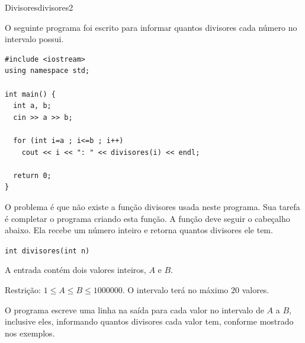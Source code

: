 \documentclass[12pt,a4paper,oneside]{article}
\begin{document}
\begin{problem}{Divisores}{divisores}{2}

\begingroup
\setlength{\intextsep}{0pt}%

O seguinte programa foi escrito para informar quantos divisores cada número no intervalo possui.

{%
\begin{lstlisting}
#include <iostream>
using namespace std;

int main() {
  int a, b;
  cin >> a >> b;

  for (int i=a ; i<=b ; i++)
    cout << i << ": " << divisores(i) << endl;

  return 0;
}
\end{lstlisting}
}

O problema é que não existe a função divisores usada neste programa. Sua tarefa é completar o programa criando esta função. A função deve seguir o cabeçalho abaixo.
Ela recebe um número inteiro e retorna quantos divisores ele tem.

\texttt{\textcolor{Mulberry}{int} divisores(\textcolor{Mulberry}{int} n)}


\InputFile

A entrada contém dois valores inteiros, $A$ e $B$.

Restrição: $1 \leq A \leq B \leq 1000000$. O intervalo terá no máximo $20$ valores.

\endgroup

\OutputFile

O programa escreve uma linha na saída para cada valor no intervalo de $A$ a $B$, inclusive eles, informando quantos divisores cada valor tem, conforme mostrado nos exemplos.


\Example

\begin{example}
%
\end{example}

\begin{example}
%
\end{example}

\begin{example}
%
\end{example}


\end{problem}
\end{document}
